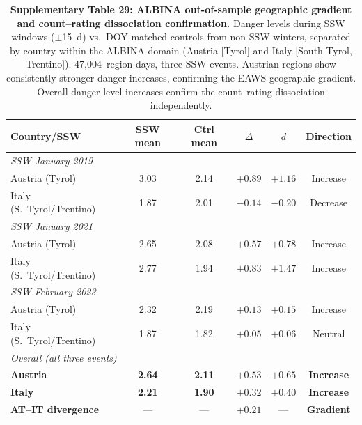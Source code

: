 \begin{table}[htbp]
\caption{\textbf{Supplementary Table 29: ALBINA out-of-sample geographic gradient and count--rating dissociation confirmation.}
Danger levels during SSW windows ($\pm$15~d) vs.\ DOY-matched controls from non-SSW winters, separated by country within the ALBINA domain (Austria [Tyrol] and Italy [South Tyrol, Trentino]). 47,004~region-days, three SSW events. Austrian regions show consistently stronger danger increases, confirming the EAWS geographic gradient. Overall danger-level increases confirm the count--rating dissociation independently.}
\label{tab:albina_expanded}
\small
\begin{tabular}{lccccc}
\toprule
Country/SSW & SSW mean & Ctrl mean & $\Delta$ & $d$ & Direction \\
\midrule
\multicolumn{6}{l}{\textit{SSW January 2019}} \\
Austria (Tyrol) & 3.03 & 2.14 & $+0.89$ & $+1.16$ & Increase \\
Italy (S.\ Tyrol/Trentino) & 1.87 & 2.01 & $-0.14$ & $-0.20$ & Decrease \\
\midrule
\multicolumn{6}{l}{\textit{SSW January 2021}} \\
Austria (Tyrol) & 2.65 & 2.08 & $+0.57$ & $+0.78$ & Increase \\
Italy (S.\ Tyrol/Trentino) & 2.77 & 1.94 & $+0.83$ & $+1.47$ & Increase \\
\midrule
\multicolumn{6}{l}{\textit{SSW February 2023}} \\
Austria (Tyrol) & 2.32 & 2.19 & $+0.13$ & $+0.15$ & Increase \\
Italy (S.\ Tyrol/Trentino) & 1.87 & 1.82 & $+0.05$ & $+0.06$ & Neutral \\
\midrule
\multicolumn{6}{l}{\textit{Overall (all three events)}} \\
\textbf{Austria} & \textbf{2.64} & \textbf{2.11} & $\mathbf{+0.53}$ & $\mathbf{+0.65}$ & \textbf{Increase} \\
\textbf{Italy} & \textbf{2.21} & \textbf{1.90} & $\mathbf{+0.32}$ & $\mathbf{+0.40}$ & \textbf{Increase} \\
\midrule
\textbf{AT--IT divergence} & --- & --- & $\mathbf{+0.21}$ & --- & \textbf{Gradient} \\
\bottomrule
\end{tabular}
\end{table}

